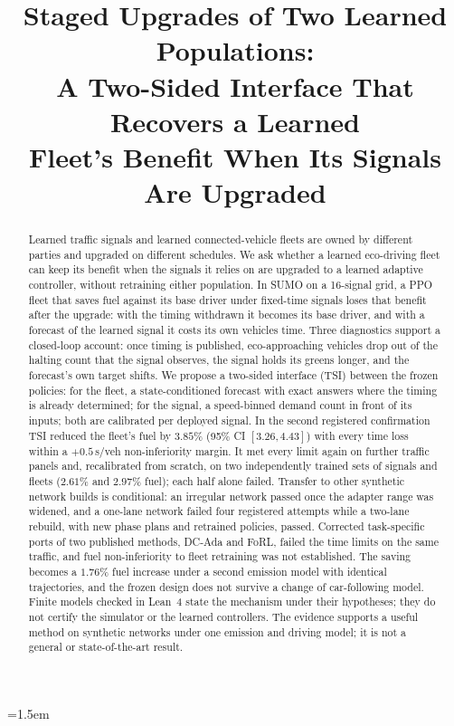 
\usepackage{multirow}
\emergencystretch=1.5em



\title{Staged Upgrades of Two Learned Populations:\\
A Two-Sided Interface That Recovers a Learned\\
Fleet's Benefit When Its Signals Are Upgraded}

\author{
}

\maketitle

\begin{abstract}
Learned traffic signals and learned connected-vehicle fleets are owned by different parties and upgraded on different schedules. We ask
whether a learned eco-driving fleet can keep its benefit when the signals it relies on are upgraded to a learned adaptive controller,
without retraining either population. In SUMO on a 16-signal grid, a PPO fleet that saves fuel against its base driver under fixed-time
signals loses that benefit after the upgrade: with the timing withdrawn it becomes its base driver, and with a forecast of the learned
signal it costs its own vehicles time. Three diagnostics support a closed-loop account: once timing is published, eco-approaching
vehicles drop out of the halting count that the signal observes, the signal holds its greens longer, and the forecast's own target
shifts. We propose a two-sided interface (TSI) between the frozen policies: for the fleet, a state-conditioned forecast with exact answers
where the timing is already determined; for the signal, a speed-binned demand count in front of its inputs; both are calibrated per
deployed signal. In the second registered confirmation TSI reduced the fleet's fuel by $3.85\%$ (95\% CI $[3.26, 4.43]$) with every time
loss within a $+0.5$\,s/veh non-inferiority margin. It met every limit again on further traffic panels and, recalibrated from scratch,
on two independently trained sets of signals and fleets ($2.61\%$ and $2.97\%$ fuel); each half alone failed. Transfer to other
synthetic network builds is conditional: an irregular network passed once the adapter range was widened, and a one-lane network failed
four registered attempts while a two-lane rebuild, with new phase plans and retrained policies, passed. Corrected task-specific ports of
two published methods, DC-Ada and FoRL, failed the time limits on the same traffic, and fuel non-inferiority to fleet retraining was not
established. The saving becomes a $1.76\%$ fuel increase under a second emission model with identical trajectories, and the frozen design
does not survive a change of car-following model. Finite models checked in Lean~4 state the mechanism under their hypotheses; they do
not certify the simulator or the learned controllers. The evidence supports a useful method on synthetic networks under one emission and
driving model; it is not a general or state-of-the-art result.
\end{abstract}

